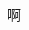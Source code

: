 \documentclass{beamer}
\begin{document}
\begin{CJK*}{UTF8}{gbsn}

\begin{frame}
啊
\end{frame}

\end{CJK*}
\end{document}
